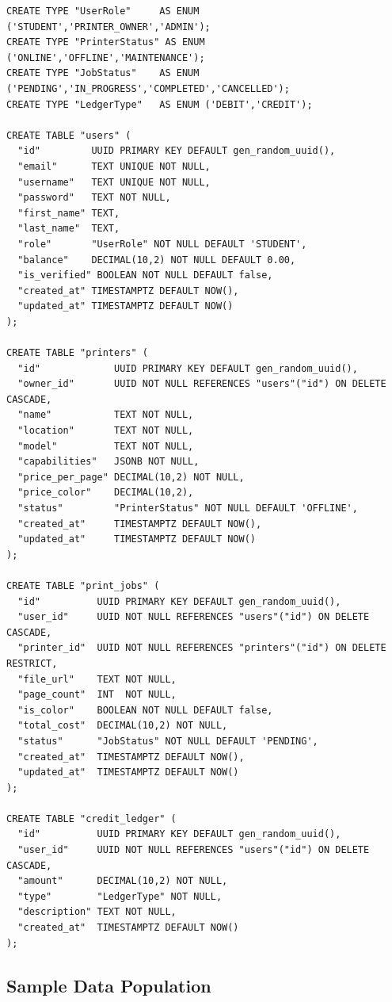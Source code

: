 \documentclass[12pt,a4paper]{report}
\begin{document}
\begin{lstlisting}[style=sqlStyle, caption={Core database tables (generated DDL)}]
CREATE TYPE "UserRole"     AS ENUM ('STUDENT','PRINTER_OWNER','ADMIN');
CREATE TYPE "PrinterStatus" AS ENUM ('ONLINE','OFFLINE','MAINTENANCE');
CREATE TYPE "JobStatus"    AS ENUM ('PENDING','IN_PROGRESS','COMPLETED','CANCELLED');
CREATE TYPE "LedgerType"   AS ENUM ('DEBIT','CREDIT');

CREATE TABLE "users" (
  "id"         UUID PRIMARY KEY DEFAULT gen_random_uuid(),
  "email"      TEXT UNIQUE NOT NULL,
  "username"   TEXT UNIQUE NOT NULL,
  "password"   TEXT NOT NULL,
  "first_name" TEXT,
  "last_name"  TEXT,
  "role"       "UserRole" NOT NULL DEFAULT 'STUDENT',
  "balance"    DECIMAL(10,2) NOT NULL DEFAULT 0.00,
  "is_verified" BOOLEAN NOT NULL DEFAULT false,
  "created_at" TIMESTAMPTZ DEFAULT NOW(),
  "updated_at" TIMESTAMPTZ DEFAULT NOW()
);

CREATE TABLE "printers" (
  "id"             UUID PRIMARY KEY DEFAULT gen_random_uuid(),
  "owner_id"       UUID NOT NULL REFERENCES "users"("id") ON DELETE CASCADE,
  "name"           TEXT NOT NULL,
  "location"       TEXT NOT NULL,
  "model"          TEXT NOT NULL,
  "capabilities"   JSONB NOT NULL,
  "price_per_page" DECIMAL(10,2) NOT NULL,
  "price_color"    DECIMAL(10,2),
  "status"         "PrinterStatus" NOT NULL DEFAULT 'OFFLINE',
  "created_at"     TIMESTAMPTZ DEFAULT NOW(),
  "updated_at"     TIMESTAMPTZ DEFAULT NOW()
);

CREATE TABLE "print_jobs" (
  "id"          UUID PRIMARY KEY DEFAULT gen_random_uuid(),
  "user_id"     UUID NOT NULL REFERENCES "users"("id") ON DELETE CASCADE,
  "printer_id"  UUID NOT NULL REFERENCES "printers"("id") ON DELETE RESTRICT,
  "file_url"    TEXT NOT NULL,
  "page_count"  INT  NOT NULL,
  "is_color"    BOOLEAN NOT NULL DEFAULT false,
  "total_cost"  DECIMAL(10,2) NOT NULL,
  "status"      "JobStatus" NOT NULL DEFAULT 'PENDING',
  "created_at"  TIMESTAMPTZ DEFAULT NOW(),
  "updated_at"  TIMESTAMPTZ DEFAULT NOW()
);

CREATE TABLE "credit_ledger" (
  "id"          UUID PRIMARY KEY DEFAULT gen_random_uuid(),
  "user_id"     UUID NOT NULL REFERENCES "users"("id") ON DELETE CASCADE,
  "amount"      DECIMAL(10,2) NOT NULL,
  "type"        "LedgerType" NOT NULL,
  "description" TEXT NOT NULL,
  "created_at"  TIMESTAMPTZ DEFAULT NOW()
);
\end{lstlisting}

\subsection{Sample Data Population}
\end{document}
